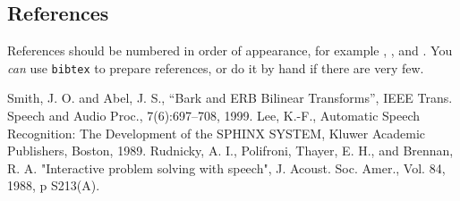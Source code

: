 \documentclass[10pt,a4paper,twocolumn]{article}
\begin{document}
\subsection{References}

References should be numbered in order of appearance, 
for example \cite{ES1}, \cite{ES2}, and \cite{ES3}. 
You \emph{can} use \texttt{bibtex} to prepare references,
or do it by hand if there are very few.

%

\begin{thebibliography}{10}
 Smith, J. O. and Abel, J. S., 
``Bark and {ERB} Bilinear Transforms'', 
IEEE Trans. Speech and Audio Proc., 7(6):697--708, 1999.  
 Lee, K.-F., Automatic Speech Recognition: 
The Development of the 
SPHINX SYSTEM, Kluwer Academic Publishers, Boston, 1989.
 Rudnicky, A. I., Polifroni, Thayer, E. H.,
 and Brennan, R. A.  
"Interactive problem solving with speech", J. Acoust. Soc. Amer., 
Vol. 84, 1988, p S213(A).
\end{thebibliography}
\end{document}
